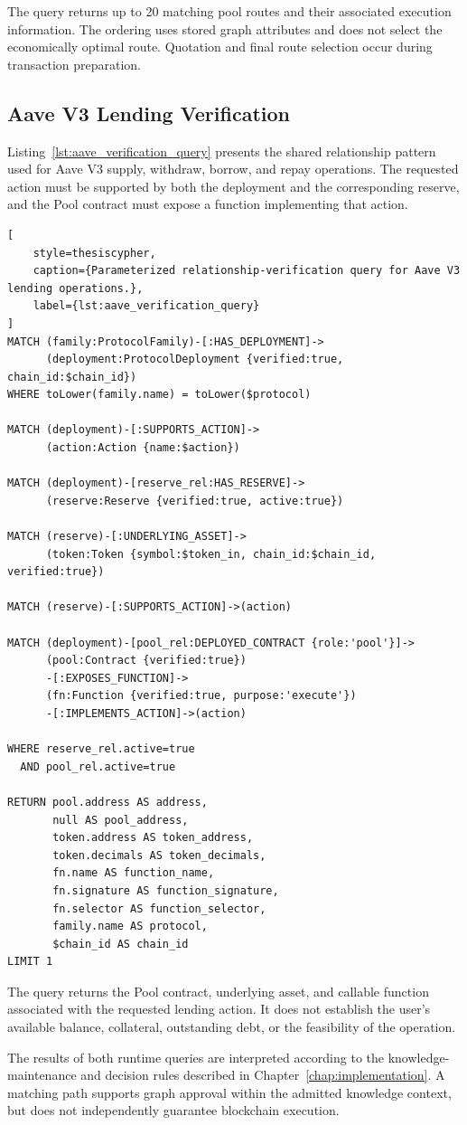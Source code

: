 The query returns up to 20 matching pool routes
and their associated execution information. The
ordering uses stored graph attributes and does not
select the economically optimal route. Quotation
and final route selection occur during transaction
preparation.



\subsection{Aave V3 Lending Verification}

Listing~\ref{lst:aave_verification_query} presents
the shared relationship pattern used for Aave V3
supply, withdraw, borrow, and repay operations.
The requested action must be supported by both
the deployment and the corresponding reserve,
and the Pool contract must expose a function
implementing that action.

\begin{lstlisting}[
    style=thesiscypher,
    caption={Parameterized relationship-verification query for Aave V3 lending operations.},
    label={lst:aave_verification_query}
]
MATCH (family:ProtocolFamily)-[:HAS_DEPLOYMENT]->
      (deployment:ProtocolDeployment {verified:true, chain_id:$chain_id})
WHERE toLower(family.name) = toLower($protocol)

MATCH (deployment)-[:SUPPORTS_ACTION]->
      (action:Action {name:$action})

MATCH (deployment)-[reserve_rel:HAS_RESERVE]->
      (reserve:Reserve {verified:true, active:true})

MATCH (reserve)-[:UNDERLYING_ASSET]->
      (token:Token {symbol:$token_in, chain_id:$chain_id, verified:true})

MATCH (reserve)-[:SUPPORTS_ACTION]->(action)

MATCH (deployment)-[pool_rel:DEPLOYED_CONTRACT {role:'pool'}]->
      (pool:Contract {verified:true})
      -[:EXPOSES_FUNCTION]->
      (fn:Function {verified:true, purpose:'execute'})
      -[:IMPLEMENTS_ACTION]->(action)

WHERE reserve_rel.active=true
  AND pool_rel.active=true

RETURN pool.address AS address,
       null AS pool_address,
       token.address AS token_address,
       token.decimals AS token_decimals,
       fn.name AS function_name,
       fn.signature AS function_signature,
       fn.selector AS function_selector,
       family.name AS protocol,
       $chain_id AS chain_id
LIMIT 1
\end{lstlisting}

The query returns the Pool contract, underlying asset,
and callable function associated with the requested
lending action. It does not establish the user's
available balance, collateral, outstanding debt, or
the feasibility of the operation.

The results of both runtime queries are interpreted
according to the knowledge-maintenance and decision
rules described in Chapter~\ref{chap:implementation}.
A matching path supports graph approval within the
admitted knowledge context, but does not independently
guarantee blockchain execution.

